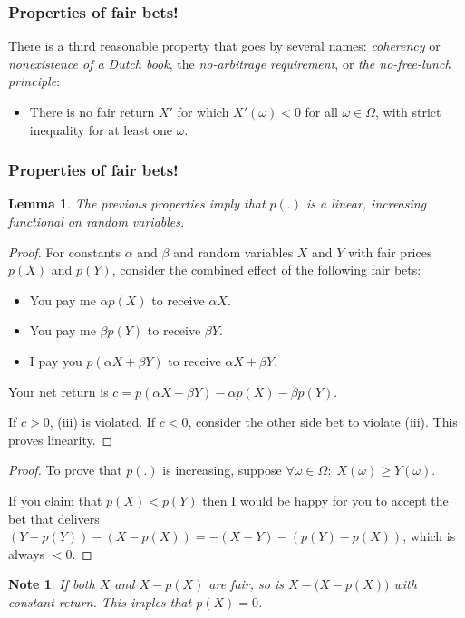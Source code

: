 \documentclass{beamer}
\newtheorem{lem}{Lemma}
\newtheorem{nots}{Note}
\begin{document}
\begin{frame}
\frametitle{Properties of fair bets!}
There is a third reasonable property that goes by several names: \textit{coherency} or
\textit{nonexistence of a Dutch book}, the \textit{no-arbitrage requirement}, or \textit{the no-free-lunch principle}:
\pause
\begin{itemize}
	\item
	There is no fair return $X'$ for which $X'(\omega) < 0$ for all $\omega \in \Omega$, with strict inequality for at least one $\omega$.
\end{itemize}
\end{frame}


\begin{frame}
\frametitle{Properties of fair bets!}
\begin{lem}
The previous properties imply that $p(.)$ is a linear, increasing functional on random variables.
\end{lem}

\begin{proof}
For constants $\alpha$ and $\beta$ and random variables $X$ and $Y$ with fair prices $p(X)$ and $p(Y)$, consider the combined effect of the following fair bets:
\begin{itemize}
\item
You pay me $\alpha p(X)$ to receive $\alpha X$.
\item
You pay me $\beta p(Y)$ to receive $\beta Y$.
\item
I pay you $p(\alpha X + \beta Y)$ to receive $\alpha X + \beta Y$.
\end{itemize}

Your net return is $c = p(\alpha X + \beta Y) - \alpha p(X) - \beta p(Y)$. 

If $c>0$, (iii) is violated. If $c<0$, consider the other side bet to violate (iii). This proves linearity.

\end{proof}
\end{frame}

\begin{frame}
\begin{proof}

To prove that $p(.)$ is increasing, suppose $\forall \omega \in \Omega:\;  X(\omega) \geq Y(\omega)$.

 If you claim
that $p(X) < p(Y)$ then I would be happy for you to accept the bet that delivers $(Y - p(Y)) - (X - p(X)) =
-(X - Y) - (p(Y) - p(X))$,
which is always $< 0$.
\end{proof}

\begin{nots}
If both $X$ and $X-p(X)$ are fair, so is $X - \big(X-p(X)\big)$ with constant return. This imples that $p(X) = 0$.
\end{nots}

\end{frame}
\end{document}
